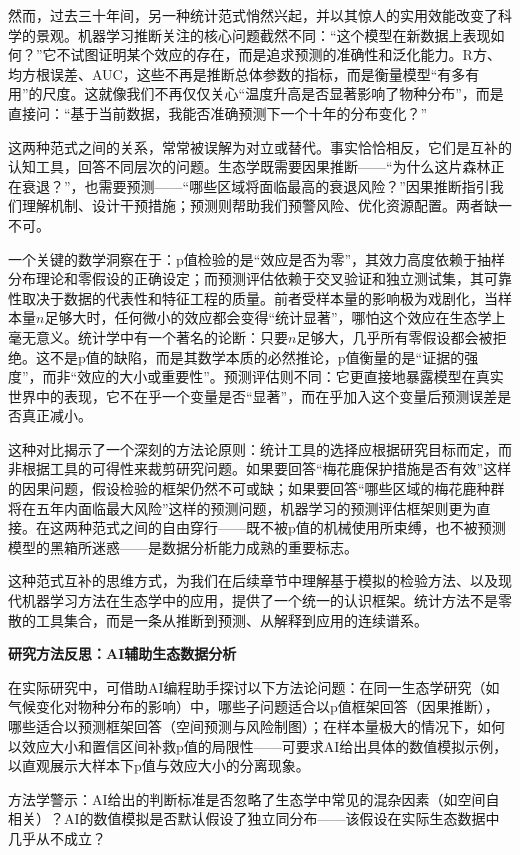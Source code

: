 \documentclass[
  twoside,12pt,fontset=none]{ctexbook}
\renewenvironment{quote}{%
  \def\FrameCommand{{\color{quote-border}\vrule width 4pt}\hspace{10pt}}%
  \MakeFramed {\advance\hsize-\width \FrameRestore\noindent\ignorespaces}%
}{%
  \endMakeFramed
}
\begin{document}
然而，过去三十年间，另一种统计范式悄然兴起，并以其惊人的实用效能改变了科学的景观。机器学习推断关注的核心问题截然不同：``这个模型在新数据上表现如何？''它不试图证明某个效应的存在，而是追求预测的准确性和泛化能力。R方、均方根误差、AUC，这些不再是推断总体参数的指标，而是衡量模型``有多有用''的尺度。这就像我们不再仅仅关心``温度升高是否显著影响了物种分布''，而是直接问：``基于当前数据，我能否准确预测下一个十年的分布变化？''

这两种范式之间的关系，常常被误解为对立或替代。事实恰恰相反，它们是互补的认知工具，回答不同层次的问题。生态学既需要因果推断------``为什么这片森林正在衰退？''，也需要预测------``哪些区域将面临最高的衰退风险？''因果推断指引我们理解机制、设计干预措施；预测则帮助我们预警风险、优化资源配置。两者缺一不可。

一个关键的数学洞察在于：p值检验的是``效应是否为零''，其效力高度依赖于抽样分布理论和零假设的正确设定；而预测评估依赖于交叉验证和独立测试集，其可靠性取决于数据的代表性和特征工程的质量。前者受样本量的影响极为戏剧化，当样本量\(n\)足够大时，任何微小的效应都会变得``统计显著''，哪怕这个效应在生态学上毫无意义。统计学中有一个著名的论断：只要\(n\)足够大，几乎所有零假设都会被拒绝。这不是p值的缺陷，而是其数学本质的必然推论，p值衡量的是``证据的强度''，而非``效应的大小或重要性''。预测评估则不同：它更直接地暴露模型在真实世界中的表现，它不在乎一个变量是否``显著''，而在乎加入这个变量后预测误差是否真正减小。

这种对比揭示了一个深刻的方法论原则：统计工具的选择应根据研究目标而定，而非根据工具的可得性来裁剪研究问题。如果要回答``梅花鹿保护措施是否有效''这样的因果问题，假设检验的框架仍然不可或缺；如果要回答``哪些区域的梅花鹿种群将在五年内面临最大风险''这样的预测问题，机器学习的预测评估框架则更为直接。在这两种范式之间的自由穿行------既不被p值的机械使用所束缚，也不被预测模型的黑箱所迷惑------是数据分析能力成熟的重要标志。

这种范式互补的思维方式，为我们在后续章节中理解基于模拟的检验方法、以及现代机器学习方法在生态学中的应用，提供了一个统一的认识框架。统计方法不是零散的工具集合，而是一条从推断到预测、从解释到应用的连续谱系。

\begin{quote}
\textbf{研究方法反思：AI辅助生态数据分析}

在实际研究中，可借助AI编程助手探讨以下方法论问题：在同一生态学研究（如气候变化对物种分布的影响）中，哪些子问题适合以p值框架回答（因果推断），哪些适合以预测框架回答（空间预测与风险制图）；在样本量极大的情况下，如何以效应大小和置信区间补救p值的局限性------可要求AI给出具体的数值模拟示例，以直观展示大样本下p值与效应大小的分离现象。

方法学警示：AI给出的判断标准是否忽略了生态学中常见的混杂因素（如空间自相关）？AI的数值模拟是否默认假设了独立同分布------该假设在实际生态数据中几乎从不成立？
\end{quote}
\end{document}

